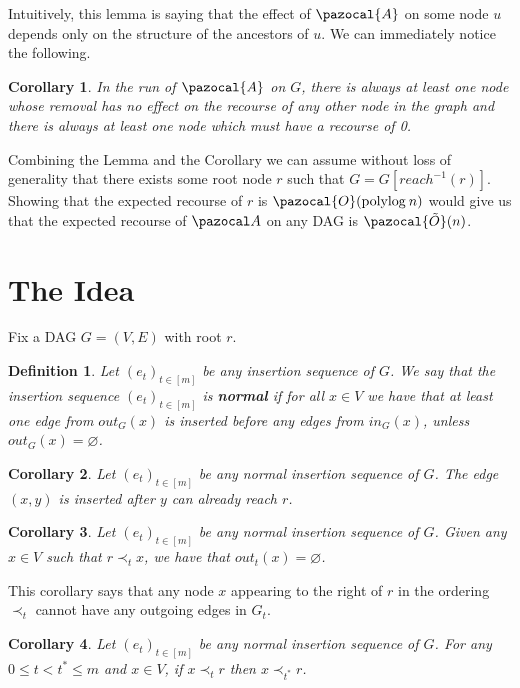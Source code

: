 \documentclass{article}
\newtheorem{corollary}{Corollary}
\newtheorem{definition}{Definition}
\begin{document}
Intuitively, this lemma is saying that the effect of $\pazocal{A}$ on some node $u$ depends only on the structure of the ancestors of $u$. We can immediately notice the following.

\begin{corollary}
In the run of $\pazocal{A}$ on $G$, there is always at least one node whose removal has no effect on the recourse of any other node in the graph and there is always at least one node which must have a recourse of 0.
\end{corollary}

Combining the Lemma and the Corollary we can assume without loss of generality that there exists some root node $r$ such that $G = G[reach^{-1}(r)]$. Showing that the expected recourse of $r$ is $\pazocal{O}(\textrm{polylog} \: n)$ would give us that the expected recourse of $\pazocal A$ on any DAG is $\pazocal{\tilde O}(n)$. 

\section{The Idea}

Fix a DAG $G=(V,E)$ with root $r$.

\begin{definition}
Let $(e_t)_{t \in [m]}$ be any insertion sequence of $G$. We say that the insertion sequence $(e_t)_{t \in [m]}$ is \textbf{normal} if for all $x \in V$ we have that at least one edge from $out_G(x)$ is inserted before any edges from $in_G(x)$, unless $out_G(x) = \varnothing$.
\end{definition}

\begin{corollary}
Let $(e_t)_{t \in [m]}$ be any normal insertion sequence of $G$. The edge $(x,y)$ is inserted after $y$ can already reach $r$.
\end{corollary}

\begin{corollary}
Let $(e_t)_{t \in [m]}$ be any normal insertion sequence of $G$. Given any $x \in V$ such that $r \prec_t x$, we have that $out_t(x) = \varnothing$.
\end{corollary}

This corollary says that any node $x$ appearing to the right of $r$ in the ordering $\prec_t$ cannot have any outgoing edges in $G_t$.

\begin{corollary}
Let $(e_t)_{t \in [m]}$ be any normal insertion sequence of $G$. For any $0 \leq t < t^* \leq m$ and $x \in V$, if $x \prec_t r$ then $x \prec_{t^*} r$.
\end{corollary}
\end{document}

